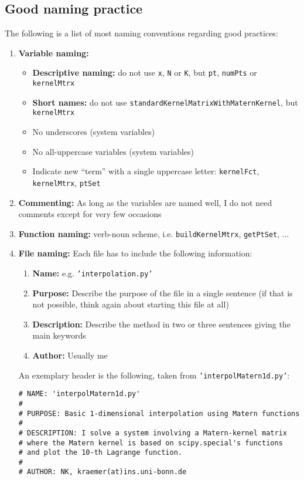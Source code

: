 \documentclass[11pt]{article}
\begin{document}
\subsection{Good naming practice}
The following is a list of most naming conventions regarding good practices:
\begin{enumerate}
\item \textbf{Variable naming:} 
\begin{itemize}
\item \textbf{Descriptive naming:} do not use \texttt{x}, \texttt{N} or \texttt{K}, but \texttt{pt}, \texttt{numPts} or \texttt{kernelMtrx}
\item \textbf{Short names:} do not use \texttt{standardKernelMatrixWithMaternKernel}, but \texttt{kernelMtrx}
\item No underscores (system variables)
\item No all-uppercase variables (system variables)
\item Indicate new ``term'' with a single uppercase letter: \texttt{kernelFct}, \texttt{kernelMtrx}, \texttt{ptSet}
\end{itemize}
\item \textbf{Commenting:} As long as the variables are named well, I do not need comments except for very few occasions
\item \textbf{Function naming:} verb-noun scheme, i.e. \texttt{buildKernelMtrx}, \texttt{getPtSet}, ...
\item \textbf{File naming:} Each file has to include the following information:
\begin{enumerate}
\item \textbf{Name:} e.g. \texttt{'interpolation.py'}
\item \textbf{Purpose:} Describe the purpose of the file in a single sentence (if that is not possible, think again about starting this file at all)
\item \textbf{Description:} Describe the method in two or three sentences giving the main keywords
\item \textbf{Author:} Usually me
\end{enumerate}
An exemplary header is the following, taken from \texttt{'interpolMatern1d.py'}:
\begin{Verbatim}[formatcom=\color{blue!50!black}]
# NAME: 'interpolMatern1d.py'
#
# PURPOSE: Basic 1-dimensional interpolation using Matern functions
#
# DESCRIPTION: I solve a system involving a Matern-kernel matrix 
# where the Matern kernel is based on scipy.special's functions
# and plot the 10-th Lagrange function.
#
# AUTHOR: NK, kraemer(at)ins.uni-bonn.de
\end{Verbatim}
\end{enumerate}
\end{document}
